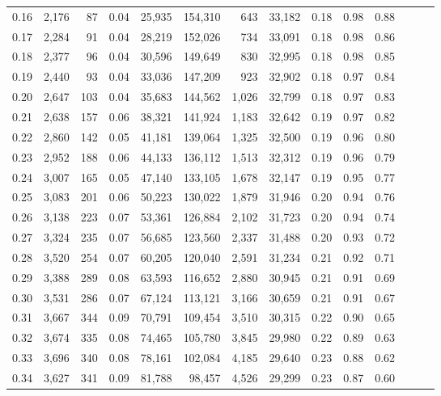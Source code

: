 \begin{tabular}{rrrrrrrrrrrrrr}
0.16 &  2,176 &   87 &  0.04 &   25,935 &  154,310 &     643 &  33,182 &  0.18 &  0.98 &      0.88 \\
0.17 &  2,284 &   91 &  0.04 &   28,219 &  152,026 &     734 &  33,091 &  0.18 &  0.98 &      0.86 \\
0.18 &  2,377 &   96 &  0.04 &   30,596 &  149,649 &     830 &  32,995 &  0.18 &  0.98 &      0.85 \\
0.19 &  2,440 &   93 &  0.04 &   33,036 &  147,209 &     923 &  32,902 &  0.18 &  0.97 &      0.84 \\
0.20 &  2,647 &  103 &  0.04 &   35,683 &  144,562 &   1,026 &  32,799 &  0.18 &  0.97 &      0.83 \\
0.21 &  2,638 &  157 &  0.06 &   38,321 &  141,924 &   1,183 &  32,642 &  0.19 &  0.97 &      0.82 \\
0.22 &  2,860 &  142 &  0.05 &   41,181 &  139,064 &   1,325 &  32,500 &  0.19 &  0.96 &      0.80 \\
0.23 &  2,952 &  188 &  0.06 &   44,133 &  136,112 &   1,513 &  32,312 &  0.19 &  0.96 &      0.79 \\
0.24 &  3,007 &  165 &  0.05 &   47,140 &  133,105 &   1,678 &  32,147 &  0.19 &  0.95 &      0.77 \\
0.25 &  3,083 &  201 &  0.06 &   50,223 &  130,022 &   1,879 &  31,946 &  0.20 &  0.94 &      0.76 \\
0.26 &  3,138 &  223 &  0.07 &   53,361 &  126,884 &   2,102 &  31,723 &  0.20 &  0.94 &      0.74 \\
0.27 &  3,324 &  235 &  0.07 &   56,685 &  123,560 &   2,337 &  31,488 &  0.20 &  0.93 &      0.72 \\
0.28 &  3,520 &  254 &  0.07 &   60,205 &  120,040 &   2,591 &  31,234 &  0.21 &  0.92 &      0.71 \\
0.29 &  3,388 &  289 &  0.08 &   63,593 &  116,652 &   2,880 &  30,945 &  0.21 &  0.91 &      0.69 \\
0.30 &  3,531 &  286 &  0.07 &   67,124 &  113,121 &   3,166 &  30,659 &  0.21 &  0.91 &      0.67 \\
0.31 &  3,667 &  344 &  0.09 &   70,791 &  109,454 &   3,510 &  30,315 &  0.22 &  0.90 &      0.65 \\
0.32 &  3,674 &  335 &  0.08 &   74,465 &  105,780 &   3,845 &  29,980 &  0.22 &  0.89 &      0.63 \\
0.33 &  3,696 &  340 &  0.08 &   78,161 &  102,084 &   4,185 &  29,640 &  0.23 &  0.88 &      0.62 \\
0.34 &  3,627 &  341 &  0.09 &   81,788 &   98,457 &   4,526 &  29,299 &  0.23 &  0.87 &      0.60 \\

\end{tabular}

